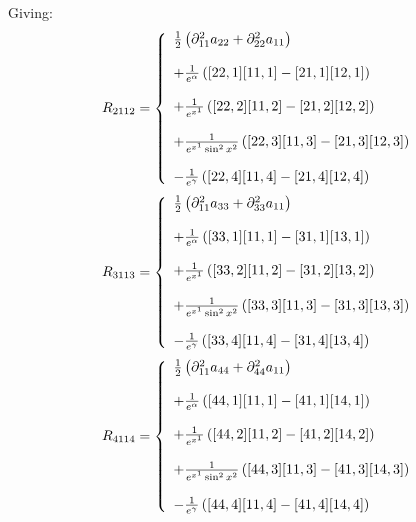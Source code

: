 Giving:
\begin{align}
R_{2112}&= \left\{\begin{array}{l}
\frac{1}{2}\left(\partial^2_{11} a_{22}+\partial^2_{22} a_{11}\right)\\\\
+ \frac{1}{e^{\alpha}}\left( [22,1] [11,1] -[21,1] [12,1]  \right)\\\\
+ \frac{1}{e^{x^1}}\left( [22,2]  [11,2] -[21,2] [12,2]  \right)\\\\
+ \frac{1}{e^{x^1}\sin^2 x^2}\left( [22,3] [11,3] -[21,3] [12,3]   \right)\\\\
-\frac{1}{e^{\gamma}}\left( [22,4]  [11,4] -[21,4] [12,4]   \right)
\end {array}\right.\\
\end{align}
\begin{align}
R_{3113}&= \left\{\begin{array}{l}
\frac{1}{2}\left(\partial^2_{11} a_{33}+\partial^2_{33} a_{11}\right)\\\\
+ \frac{1}{e^{\alpha}}\left( [33,1] [11,1] -[31,1] [13,1]  \right)\\\\
+ \frac{1}{e^{x^1}}\left( [33,2] [11,2] -[31,2] [13,2]   \right)\\\\
+ \frac{1}{e^{x^1}\sin^2 x^2}\left( [33,3] [11,3] -[31,3] [13,3]  \right)\\\\
-\frac{1}{e^{\gamma}}\left( [33,4]  [11,4] -[31,4] [13,4]   \right)
\end {array}\right.\\
\end{align}
\begin{align}
R_{4114}&= \left\{\begin{array}{l}
\frac{1}{2}\left(\partial^2_{11} a_{44}+\partial^2_{44} a_{11}\right)\\\\
+ \frac{1}{e^{\alpha}}\left( [44,1] [11,1] -[41,1] [14,1]  \right)\\\\
+ \frac{1}{e^{x^1}}\left( [44,2]  [11,2]  -[41,2] [14,2]  \right)\\\\
+ \frac{1}{e^{x^1}\sin^2 x^2}\left( [44,3]  [11,3] -[41,3] [14,3]  \right)\\\\
-\frac{1}{e^{\gamma}}\left( [44,4] [11,4] -[41,4] [14,4]  \right)
\end {array}\right.\\
\end{align}
